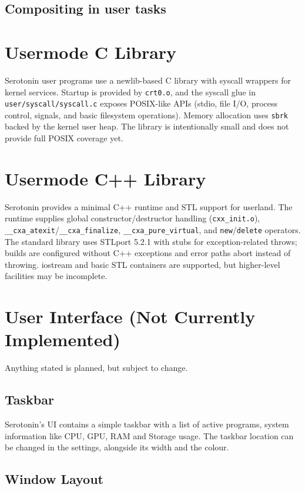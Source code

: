 \documentclass[11pt,a4paper]{article}
\begin{document}
    \subsection{Compositing in user tasks}

    \section{Usermode C Library}
	Serotonin user programs use a newlib-based C library with syscall wrappers for kernel services. Startup is provided by \texttt{crt0.o}, and the syscall glue in \texttt{user/syscall/syscall.c} exposes POSIX-like APIs (stdio, file I/O, process control, signals, and basic filesystem operations). Memory allocation uses \texttt{sbrk} backed by the kernel user heap. The library is intentionally small and does not provide full POSIX coverage yet.

    \section{Usermode C++ Library}
	Serotonin provides a minimal C++ runtime and STL support for userland. The runtime supplies global constructor/destructor handling (\texttt{cxx\_init.o}), \texttt{\_\_cxa\_atexit}/\texttt{\_\_cxa\_finalize}, \texttt{\_\_cxa\_pure\_virtual}, and \texttt{new}/\texttt{delete} operators. The standard library uses STLport 5.2.1 with stubs for exception-related throws; builds are configured without C++ exceptions and error paths abort instead of throwing. iostream and basic STL containers are supported, but higher-level facilities may be incomplete.

    \section{User Interface (Not Currently Implemented)}

    Anything stated is planned, but subject to change.

    \subsection{Taskbar}

    Serotonin's UI contains a simple taskbar with a list of active programs, system information like CPU, GPU, RAM and Storage usage. The taskbar location can be changed in the settings, alongside its width and the colour.

    \subsection{Window Layout}
\end{document}

